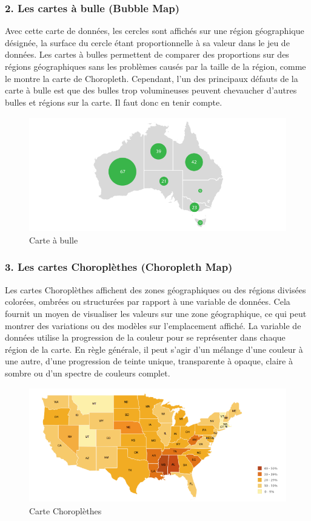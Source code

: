 \documentclass[french, a4paper, 12pt]{report}
\begin{document}
\subsubsection{2. Les cartes à bulle (Bubble Map)}
Avec cette carte de données, les cercles sont affichés sur une région géographique désignée, la surface du cercle étant proportionnelle à sa valeur dans le jeu de données. Les cartes à bulles permettent de comparer des proportions sur des régions géographiques sans les problèmes causés par la taille de la région, comme le montre la carte de Choropleth. Cependant, l'un des principaux défauts de la carte à bulle est que des bulles trop volumineuses peuvent chevaucher d'autres bulles et régions sur la carte. Il faut donc en tenir compte.
\begin{figure}[!ht]
    \centering
    \includegraphics[height=5cm]{images/bubble_map.png}
    \caption{Carte à bulle}
    \label{fig:2.8}
\end{figure}
\subsubsection{3. Les cartes Choroplèthes (Choropleth Map)}
Les cartes Choroplèthes affichent des zones géographiques ou des régions divisées colorées, ombrées ou structurées par rapport à une variable de données. Cela fournit un moyen de visualiser les valeurs sur une zone géographique, ce qui peut montrer des variations ou des modèles sur l'emplacement affiché.
La variable de données utilise la progression de la couleur pour se représenter dans chaque région de la carte. En règle générale, il peut s'agir d'un mélange d'une couleur à une autre, d'une progression de teinte unique, transparente à opaque, claire à sombre ou d'un spectre de couleurs complet.
\begin{figure}[!ht]
    \centering
    \includegraphics[height=5cm]{images/choropleth.png}
    \caption{Carte Choroplèthes}
    \label{fig:2.9}
\end{figure}
\end{document}
